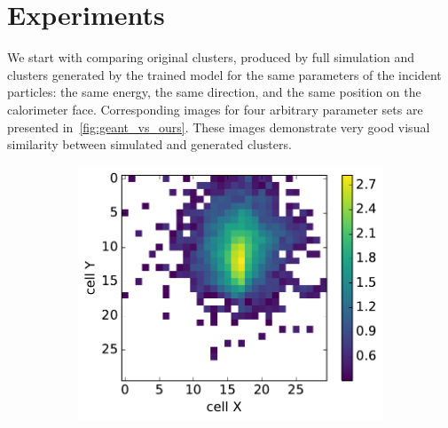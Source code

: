 \section{Experiments}

We start with comparing original clusters, produced by full \geant
simulation and clusters generated by the trained model for the same
 parameters of the incident particles: the same energy, the same direction,
 and the same position on the calorimeter face. Corresponding images
 for four arbitrary parameter sets are presented
 in~\cref{fig:geant_vs_ours}. These images demonstrate very good
 visual similarity between simulated and generated clusters.

\begin{figure}
\captionsetup[subfigure]{justification=centering}
  \centering
  \begin{subfigure}{0.24\textwidth}
    \centering
    \includegraphics[width=1\textwidth]{figures/1_real.pdf}
  \end{subfigure}
  \begin{subfigure}{0.24\textwidth}
    \centering

\end{subfigure}
\end{figure}
